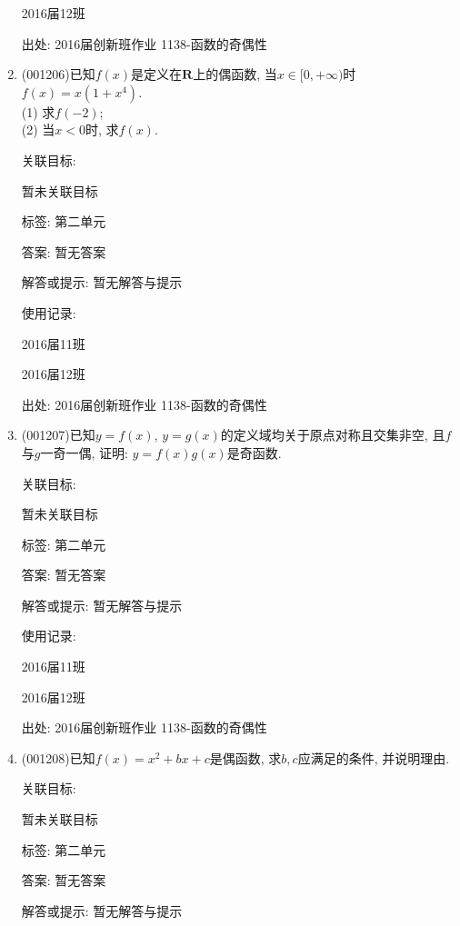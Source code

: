 \documentclass[10pt,a4paper]{article}
\begin{document}
\begin{enumerate}[1.]
2016届12班					


出处: 2016届创新班作业	1138-函数的奇偶性
\item { (001206)}已知$f(x)$是定义在$\mathbf{R}$上的偶函数, 当$x\in [0,+\infty)$时$f(x)=x(1+x^4)$.\\ 
(1) 求$f(-2)$;\\ 
(2) 当$x<0$时, 求$f(x)$.


关联目标:

暂未关联目标



标签: 第二单元

答案: 暂无答案

解答或提示: 暂无解答与提示

使用记录:

2016届11班		

2016届12班		


出处: 2016届创新班作业	1138-函数的奇偶性
\item { (001207)}已知$y=f(x)$, $y=g(x)$的定义域均关于原点对称且交集非空, 且$f$与$g$一奇一偶, 证明: $y=f(x)g(x)$是奇函数.


关联目标:

暂未关联目标



标签: 第二单元

答案: 暂无答案

解答或提示: 暂无解答与提示

使用记录:

2016届11班	

2016届12班	


出处: 2016届创新班作业	1138-函数的奇偶性
\item { (001208)}已知$f(x)=x^2+bx+c$是偶函数, 求$b,c$应满足的条件, 并说明理由.


关联目标:

暂未关联目标



标签: 第二单元

答案: 暂无答案

解答或提示: 暂无解答与提示


\end{enumerate}
\end{document}
